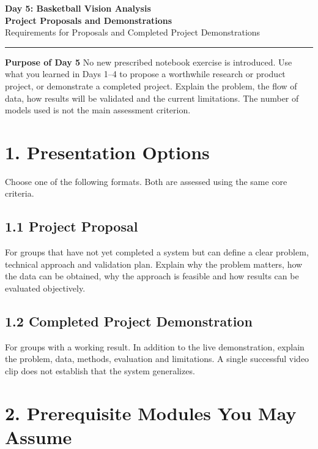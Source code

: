 \documentclass[11pt,a4paper]{article}
\begin{document}
\begin{center}
  {\LARGE\bfseries Day 5: Basketball Vision Analysis\\Project Proposals and Demonstrations}\\[5pt]
  {\large Requirements for Proposals and Completed Project Demonstrations}\\[8pt]
  \rule{0.92\textwidth}{0.6pt}
\end{center}

\begin{tcolorbox}[colback=Soft,colframe=Rule,arc=1mm,boxrule=0.5pt]
\textbf{Purpose of Day 5}\quad
No new prescribed notebook exercise is introduced. Use what you learned in Days 1--4 to propose a worthwhile research or product project, or demonstrate a completed project. Explain the problem, the flow of data, how results will be validated and the current limitations. The number of models used is not the main assessment criterion.
\end{tcolorbox}

\section{1. Presentation Options}

Choose one of the following formats. Both are assessed using the same core criteria.

\subsection{1.1 Project Proposal}

For groups that have not yet completed a system but can define a clear problem, technical approach and validation plan. Explain why the problem matters, how the data can be obtained, why the approach is feasible and how results can be evaluated objectively.

\subsection{1.2 Completed Project Demonstration}

For groups with a working result. In addition to the live demonstration, explain the problem, data, methods, evaluation and limitations. A single successful video clip does not establish that the system generalizes.

\section{2. Prerequisite Modules You May Assume}
\end{document}
